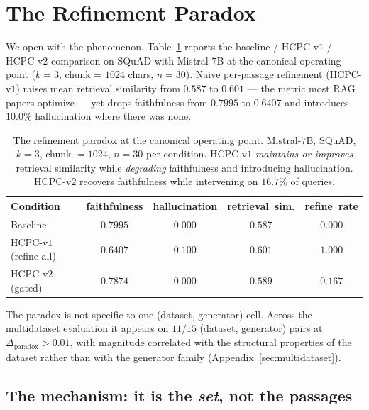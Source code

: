 \section{The Refinement Paradox}
\label{sec:paradox}



We open with the phenomenon. Table~\ref{tab:hcpc_main} reports the
baseline / HCPC-v$1$ / HCPC-v$2$ comparison on SQuAD with Mistral-$7$B
at the canonical operating point ($k{=}3$, chunk = $1024$ chars,
$n{=}30$). Naive per-passage refinement (HCPC-v$1$) raises mean
retrieval similarity from $0.587$ to $0.601$ --- the metric most RAG
papers optimize --- yet drops faithfulness from $0.7995$ to $0.6407$
and introduces $10.0\%$ hallucination where there was none.

\begin{table}[!htb]
\centering
\caption{The refinement paradox at the canonical operating point.
Mistral-$7$B, SQuAD, $k=3$, chunk $= 1024$, $n=30$ per condition.
HCPC-v$1$ \emph{maintains or improves} retrieval similarity while
\emph{degrading} faithfulness and introducing hallucination.
HCPC-v$2$ recovers faithfulness while intervening on $16.7\%$ of queries.}
\label{tab:hcpc_main}
\footnotesize
\begin{tabular}{lcccc}
\toprule
Condition & faithfulness & hallucination & retrieval~sim. & refine~rate \\
\midrule
Baseline       & $0.7995$ & $0.000$ & $0.587$ & $0.000$ \\
HCPC-v$1$ (refine all) & $0.6407$ & $\mathbf{0.100}$ & $0.601$ & $1.000$ \\
HCPC-v$2$ (gated)      & $\mathbf{0.7874}$ & $0.000$ & $0.589$ & $0.167$ \\
\bottomrule
\end{tabular}
\end{table}

The paradox is not specific to one (dataset, generator) cell. Across
the multidataset evaluation it appears on $11/15$ (dataset, generator)
pairs at $\Delta_{\textrm{paradox}} > 0.01$, with magnitude correlated
with the structural properties of the dataset rather than with the
generator family (Appendix~\ref{sec:multidataset}).

\subsection{The mechanism: it is the \emph{set}, not the passages}
\label{sec:paradox:mechanism}


